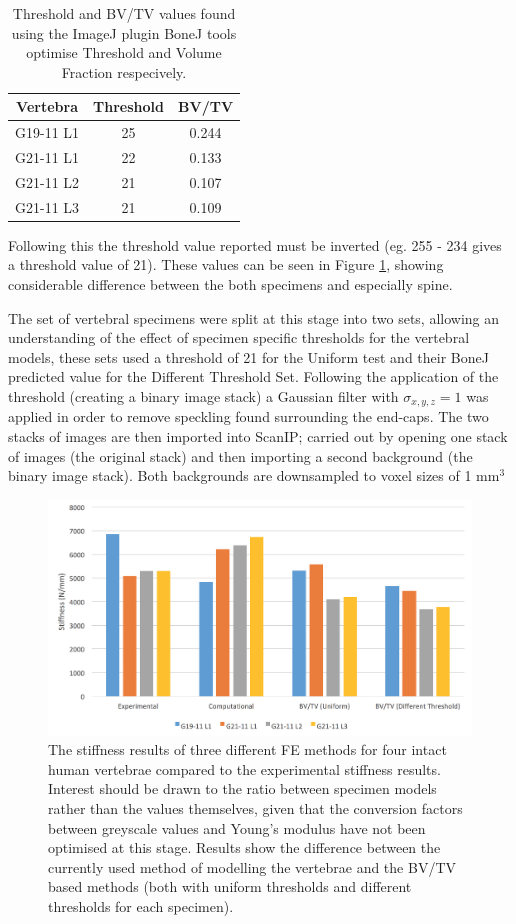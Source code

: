 \begin{table}[ht!]
	\caption{Threshold and BV/TV values found using the ImageJ plugin BoneJ tools optimise Threshold and Volume Fraction respecively.}
	\label{tab:th_bv_tv}
	\centering
	\begin{tabular}{c|c|c}
		Vertebra & Threshold & BV/TV \\
	\hline
	\hline
	G19-11 L1 & 25 & 0.244\\
	G21-11 L1 & 22 & 0.133\\
	G21-11 L2 & 21 & 0.107\\
	G21-11 L3 & 21 & 0.109\\
	\hline
	\end{tabular}
\end{table}

Following this the threshold value reported must be inverted (eg. 255 - 234 gives a threshold value of 21).
These values can be seen in Figure \ref{tab:th_bv_tv}, showing considerable difference between the both specimens and especially spine.

The set of vertebral specimens were split at this stage into two sets, allowing an understanding of the effect of specimen specific thresholds for the vertebral models, these sets used a threshold of 21 for the Uniform test and their BoneJ predicted value for the Different Threshold Set.
Following the application of the threshold (creating a binary image stack) a Gaussian filter with $ \sigma_{x,y,z} = 1 $ was applied in order to remove speckling found surrounding the end-caps.
The two stacks of images are then imported into ScanIP; carried out by opening one stack of images (the original stack) and then importing a second background (the binary image stack).
Both backgrounds are downsampled to voxel sizes of 1 mm$^3$

\begin{figure}[h]
\centering
\includegraphics[width=6in]{Chapters/Chapter_HT_images/diffModellingMethods.png}
\caption{The stiffness results of three different FE methods for four intact human vertebrae compared to the experimental stiffness results.
	Interest should be drawn to the ratio between specimen models rather than the values themselves, given that the conversion factors between greyscale values and Young's modulus have not been optimised at this stage.
Results show the difference between the currently used method of modelling the vertebrae and the BV/TV based methods (both with uniform thresholds and different thresholds for each specimen).}
\label{fig:diffModellingMethods}
\end{figure}


